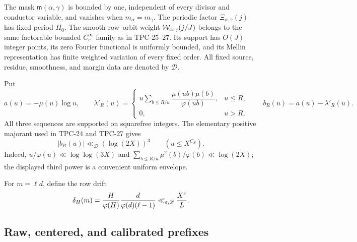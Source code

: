 The mask $\mathfrak m(\alpha,\gamma)$ is bounded by one, independent
of every divisor and conductor variable, and vanishes when
$m_\alpha=m_\gamma$.  The periodic factor
\(\Xi_{\alpha,\gamma}(j)\) has fixed period $H_0$.  The smooth
row--orbit weight $\mathcal W_{\alpha,\gamma}(j/J)$ belongs to the same
factorable bounded $C_c^\infty$ family as in TPC-25--27.  Its support
has $O(J)$ integer points, its zero Fourier functional is uniformly
bounded, and its Mellin representation has finite weighted variation
of every fixed order.  All fixed source, residue, smoothness, and
margin data are denoted by $\mathscr D$.

Put
\begin{equation}
 a(u)=-\mu(u)\log u,
 \qquad
 \lambda'_R(u)=
 \begin{cases}
 u\displaystyle\sum_{b\le R/u}
 \dfrac{\mu(ub)\mu(b)}{\varphi(ub)},&u\le R,\\[7pt]
 0,&u>R,
 \end{cases}
 \qquad b_R(u)=a(u)-\lambda'_R(u).
 \label{eq:tpc28-coefficients}
\end{equation}
All three sequences are supported on squarefree integers.  The elementary positive
majorant used in TPC-24 and TPC-27 gives
\begin{equation}
 |b_R(u)|\ll_{\mathscr D}(\log(2X))^3
 \qquad (u\le X^{C_S}).
 \label{eq:tpc28-pointwise-b}
\end{equation}
Indeed, $u/\varphi(u)\ll\log\log(3X)$ and
$\sum_{b\le R/u}\mu^2(b)/\varphi(b)\ll\log(2X)$; the displayed
third power is a convenient uniform envelope.

For $m=\ell d$, define the row drift
\begin{equation}
 \delta_H(m)
 =\frac H{\varphi(H)}
  \frac d{\varphi(d)(\ell-1)}
 \ll_{\varepsilon,\mathscr D}\frac{X^\varepsilon}{L}.
 \label{eq:tpc28-row-drift}
\end{equation}

\subsection{Raw, centered, and calibrated prefixes}

